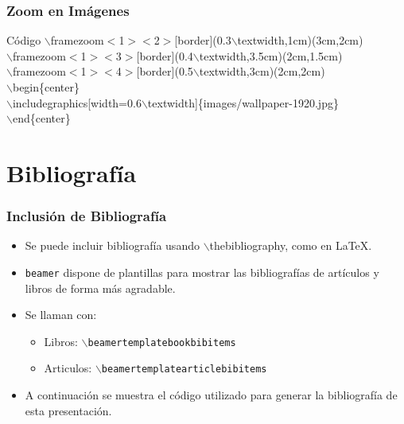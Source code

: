 \documentclass[aspectratio=1610]{beamer}%
\begin{document}
\begin{frame}[fragile]
\frametitle{\textbf{Zoom en Imágenes}}
\justifying
 \begin{block}{Código}
$\backslash$framezoom$<$1$><$2$>$[border](0.3$\backslash$textwidth,1cm)(3cm,2cm) \\
$\backslash$framezoom$<$1$><$3$>$[border](0.4$\backslash$textwidth,3.5cm)(2cm,1.5cm)\\
$\backslash$framezoom$<$1$><$4$>$[border](0.5$\backslash$textwidth,3cm)(2cm,2cm) \\
$\backslash$begin\{center\}\\
$\backslash$includegraphics[width=0.6$\backslash$textwidth]\{images/wallpaper-1920.jpg\}\\
$\backslash$end\{center\}
\end{block}

\end{frame}


\section{Bibliografía}
\begin{frame}[fragile]
\frametitle{\textbf{Inclusión de Bibliografía}}
\justifying
 \begin{itemize}\justifying
  \item Se puede incluir bibliografía usando $\backslash$thebibliography, como en \LaTeX{}.
  \item \texttt{beamer} dispone de plantillas para mostrar las bibliografías de artículos y libros de forma más agradable.
  \item Se llaman con:
  \begin{itemize}\justifying
  \item Libros: \texttt{$\backslash$beamertemplatebookbibitems}
  \item Articulos: \texttt{$\backslash$beamertemplatearticlebibitems}
\end{itemize}
  \item A continuación se muestra el código utilizado para generar la bibliografía de esta presentación.
\end{itemize}
\end{frame}
\end{document}
